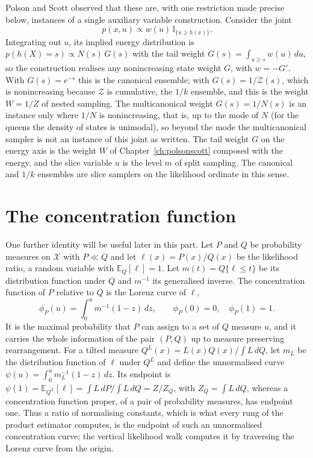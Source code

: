 \documentclass[11pt,twoside,openany]{book}
\theoremstyle{plain}
\theoremstyle{definition}
\theoremstyle{remark}
\newcommand{\EE}{\mathbb{E}}
\newcommand{\Ind}{\mathbb{I}}
\newcommand{\cX}{\mathcal{X}}
\begin{document}
Polson and Scott observed that these are, with one restriction made precise below, instances of a single auxiliary variable construction. Consider the joint
\[
p(x, u) \propto w(u) \, \Ind_{\{u \ge h(x)\}} .
\]
Integrating out $u$, its implied energy distribution is $p(h(X) = s) \propto N(s) \, G(s)$ with the tail weight $G(s) = \int_{u \ge s} w(u) \, du$, so the construction realises any nonincreasing state weight $G$, with $w = -G'$. With $G(s) = e^{-s}$ this is the canonical ensemble; with $G(s) = 1 / \mathcal{Z}(s)$, which is nonincreasing because $\mathcal{Z}$ is cumulative, the $1/k$ ensemble, and this is the weight $W = 1/Z$ of nested sampling. The multicanonical weight $G(s) = 1 / N(s)$ is an instance only where $1/N$ is nonincreasing, that is, up to the mode of $N$ (for the queens the density of states is unimodal), so beyond the mode the multicanonical sampler is not an instance of this joint as written. The tail weight $G$ on the energy axis is the weight $W$ of Chapter~\ref{ch:polsonscott} composed with the energy, and the slice variable $u$ is the level $m$ of split sampling. The canonical and $1/k$ ensembles are slice samplers on the likelihood ordinate in this sense.

\section{The concentration function}

One further identity will be useful later in this part. Let $P$ and $Q$ be probability measures on $\cX$ with $P \ll Q$ and let $\ell(x) = P(x) / Q(x)$ be the likelihood ratio, a random variable with $\EE_Q[\ell] = 1$. Let $m(t) = Q\{ \ell \le t \}$ be its distribution function under $Q$ and $m^{-1}$ its generalised inverse. The concentration function of $P$ relative to $Q$ is the Lorenz curve of $\ell$,
\[
\phi_P(u) = \int_0^u m^{-1}(1 - z) \, dz , \qquad \phi_P(0) = 0, \quad \phi_P(1) = 1 .
\]
It is the maximal probability that $P$ can assign to a set of $Q$ measure $u$, and it carries the whole information of the pair $(P, Q)$ up to measure preserving rearrangement. For a tilted measure $Q^L(x) = L(x) Q(x) / \int L \, dQ$, let $m_L$ be the distribution function of $\ell$ under $Q^L$ and define the unnormalised curve $\psi(u) = \int_0^u m_L^{-1}(1 - z) \, dz$. Its endpoint is $\psi(1) = \EE_{Q^L}[\ell] = \int L \, dP / \int L \, dQ = Z / Z_Q$, with $Z_Q = \int L \, dQ$, whereas a concentration function proper, of a pair of probability measures, has endpoint one. Thus a ratio of normalising constants, which is what every rung of the product estimator computes, is the endpoint of such an unnormalised concentration curve; the vertical likelihood walk computes it by traversing the Lorenz curve from the origin.
\end{document}
